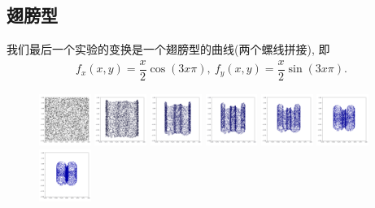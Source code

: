 \documentclass[lang=cn,11pt]{elegantpaper}
\begin{document}
\subsection{翅膀型}

我们最后一个实验的变换是一个翅膀型的曲线(两个螺线拼接), 即
\begin{align*}
	f_x(x,y) = \dfrac{x}{2} \cos (3x\pi),\ f_y(x,y) = \dfrac{x}{2} \sin (3x\pi).
\end{align*}

\begin{figure}[htpb]
  \centering
  \includegraphics[width=0.15\textwidth]{wings_1_1}
  \includegraphics[width=0.15\textwidth]{wings_1_2}
  \includegraphics[width=0.15\textwidth]{wings_1_3}
  \includegraphics[width=0.15\textwidth]{wings_1_4}
  \includegraphics[width=0.15\textwidth]{wings_1_5}
  \includegraphics[width=0.15\textwidth]{wings_1_6}\\
  \includegraphics[width=0.15\textwidth]{wings_1_7}

\end{figure}
\end{document}
